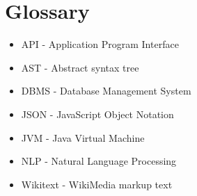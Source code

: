 \section*{Glossary}

\begin{itemize}
\item API - Application Program Interface
\item AST - Abstract syntax tree
\item DBMS - Database Management System
\item JSON - JavaScript Object Notation
\item JVM - Java Virtual Machine
\item NLP - Natural Language Processing
\item Wikitext - WikiMedia markup text
\end{itemize}